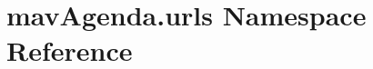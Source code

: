 \hypertarget{namespacemavAgenda_1_1urls}{}\section{mav\+Agenda.\+urls Namespace Reference}
\label{namespacemavAgenda_1_1urls}
